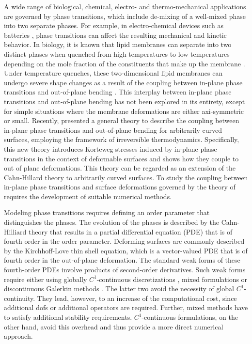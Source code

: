 \documentclass[11pt]{article}
\begin{document}
A wide range of biological, chemical, electro- and thermo-mechanical applications are governed by phase transitions, which include de-mixing of a well-mixed phase into two separate phases. 
For example, in electro-chemical devices such as batteries \citep{tang10,ebner13}, phase transitions can affect the resulting mechanical and kinetic behavior. 
In biology, it is known that lipid membranes can separate into two distinct phases when quenched from high temperatures to low temperatures depending on the mole fraction of the constituents that make up the membrane \citep{veatch03}. 
Under temperature quenches, these two-dimensional lipid membranes can undergo severe shape changes as a result of the coupling between in-plane phase transitions and out-of-plane bending \citep{baumgart03}. 
This interplay between in-plane phase transitions and out-of-plane bending has not been explored in its entirety, except for simple situations where the membrane deformations are either axi-symmetric or small. %
Recently, \citet{sahu17} presented a general theory to describe the coupling between in-plane phase transitions and out-of-plane bending for arbitrarily curved surfaces, employing the framework of irreversible thermodynamics. 
Specifically, this new theory introduces Korteweg stresses induced by in-plane phase transitions in the context of deformable surfaces and shows how they couple to out of plane deformations. 
This theory can be regarded as an extension of the Cahn-Hillard theory \citep{cahn58-1, cahn61} to arbitrarily curved surfaces. 
To study the coupling between in-plane phase transitions and surface deformations governed by the theory of \citet{sahu17} requires the development of suitable numerical methods.

Modeling phase transitions requires defining an order parameter %
that distinguishes the %
phases. 
The evolution of the phases is described by the Cahn-Hilliard theory that results in a partial differential equation (PDE) that is of fourth order in the order parameter. 
Deforming surfaces are commonly described by the Kirchhoff-Love thin shell equation, which is a vector-valued PDE that is of fourth order in the out-of-plane deformation. 
The standard weak forms of these fourth-order PDEs involve products of second-order derivatives.
Such weak forms require either using globally $C^1$-continuous discretizations \citep{gomez08-1, bartezzaghi15, kastner16-1}, mixed formulations \citep{elliott89,barrett99} or discontinuous Galerkin methods \citep{wells06,xia07}.
The latter two avoid the necessity of global $C^1$-continuity. 
They lead, however, to an increase of the computational cost, since additional dofs or additional operators are required.
Further, mixed methods have to satisfy additional stability requirements.
$C^1$-continuous formulations, on the other hand, avoid this overhead and thus provide a more direct numerical approach.
\end{document}

